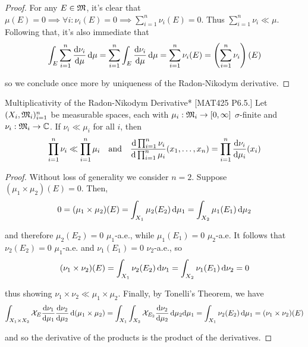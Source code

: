 \begin{proof}
    For any \(E \in \mathfrak{M}\), it's clear that \(\mu(E) = 0 \implies \forall i: \nu_i(E) = 0 \implies \sum_{i=1}^n \nu_i(E) = 0\). Thus \(\sum_{i=1}^n \nu_i \ll \mu\). Following that, it's also immediate that 
    \[
        \int_E \sum_{i=1}^n \frac{\mathrm{d}\nu_i}{\mathrm{d}\mu} \, \mathrm{d}\mu
        = \sum_{i=1}^n \int_E \frac{\mathrm{d}\nu_i}{\mathrm{d}\mu} \, \mathrm{d}\mu
        = \sum_{i=1}^n \nu_i(E)
        = \left( \sum_{i=1}^n \nu_i \right) (E)
    \]

    so we conclude once more by uniqueness of the Radon-Nikodym derivative. 
\end{proof}

\begin{problem}{Multiplicativity of the Radon-Nikodym Derivative}*
    [MAT425 P6.5.] Let \((X_i, \mathfrak{M}_i)_{i=1}^n\) be measurable spaces, each with \(\mu_i : \mathfrak{M}_i \to [0, \infty]\) \(\sigma\)-finite and \(\nu_i : \mathfrak{M}_i \to \mathbb{C}\). If \(\nu_i \ll \mu_i\) for all \(i\), then
    \[
        \prod_{i=1}^n \nu_i \ll \prod_{i=1}^n \mu_i 
        \quad \text{and} \quad 
        \frac{ \mathrm{d} \prod_{i=1}^n \nu_i }{ \mathrm{d} \prod_{i=1}^n \mu_i } (x_1, \dots, x_n) = \prod_{i=1}^n \frac{\mathrm{d}\nu_i}{\mathrm{d}\mu_i} (x_i) 
    \]
\end{problem}

\begin{proof}
    Without loss of generality we consider \(n=2\). Suppose \((\mu_1 \times \mu_2)(E) = 0\). Then, 
    \[
        0 
        = (\mu_1 \times \mu_2)(E) 
        = \int_{X_1} \mu_2(E_2) \, \mathrm{d}\mu_1
        = \int_{X_2} \mu_1(E_1) \, \mathrm{d}\mu_2
    \]

    and therefore \(\mu_2(E_2) = 0\) \(\mu_1\)-a.e., while \(\mu_1(E_1) = 0\) \(\mu_2\)-a.e. It follows that \(\nu_2(E_2) = 0\) \(\mu_1\)-a.e. and \(\nu_1(E_1) = 0\) \(\nu_2\)-a.e., so 
    \[
        (\nu_1 \times \nu_2)(E) = \int_{X_1} \nu_2(E_2) \, \mathrm{d}\nu_1 = \int_{X_2} \nu_1(E_1) \, \mathrm{d}\nu_2 = 0
    \]

    thus showing \(\nu_1 \times \nu_2 \ll \mu_1 \times \mu_2\). Finally, by Tonelli's Theorem, we have 
    \[
        \int_{X_1 \times X_2} \mathcal{X}_E \frac{\mathrm{d}\nu_1}{\mathrm{d}\mu_1} \frac{\mathrm{d}\nu_2}{\mathrm{d}\mu_2} \, \mathrm{d} (\mu_1 \times \mu_2)
        = \int_{X_1} \int_{X_2} \mathcal{X}_{E_2} \frac{\mathrm{d} \nu_2}{\mathrm{d} \mu_2} \, \mathrm{d} \mu_2 \mathrm{d}\mu_1 
        = \int_{X_1} \nu_2(E_2) \, \mathrm{d}\mu_1
        = (\nu_1 \times \nu_2)(E)
    \]

    and so the derivative of the products is the product of the derivatives. 
\end{proof}






